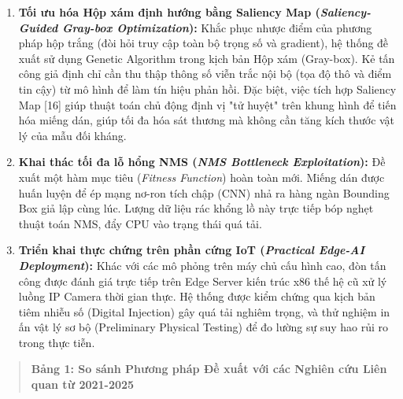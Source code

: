 \documentclass[a4paper,fleqn]{cas-dc}
\begin{document}
\begin{enumerate}
\def\labelenumi{\arabic{enumi}.}
\item
  \textbf{Tối ưu hóa Hộp xám định hướng bằng Saliency Map
  (\emph{Saliency-Guided Gray-box Optimization}):} Khắc phục nhược điểm
  của phương pháp hộp trắng (đòi hỏi truy cập toàn bộ trọng số và
  gradient), hệ thống đề xuất sử dụng Genetic Algorithm trong kịch bản
  Hộp xám (Gray-box). Kẻ tấn công giả định chỉ cần thu thập thông số
  viễn trắc nội bộ (tọa độ thô và điểm tin cậy) từ mô hình để làm tín
  hiệu phản hồi. Đặc biệt, việc tích hợp Saliency Map {[}16{]} giúp
  thuật toán chủ động định vị "tử huyệt" trên khung hình để tiến hóa
  miếng dán, giúp tối đa hóa sát thương mà không cần tăng kích thước vật
  lý của mẫu đối kháng.
\item
  \textbf{Khai thác tối đa lỗ hổng NMS (\emph{NMS Bottleneck
  Exploitation}):} Đề xuất một hàm mục tiêu (\emph{Fitness Function})
  hoàn toàn mới. Miếng dán được huấn luyện để ép mạng nơ-ron tích chập
  (CNN) nhả ra hàng ngàn Bounding Box giả lập cùng lúc. Lượng dữ liệu
  rác khổng lồ này trực tiếp bóp nghẹt thuật toán NMS, đẩy CPU vào trạng
  thái quá tải.
\item
  \textbf{Triển khai thực chứng trên phần cứng IoT (\emph{Practical
  Edge-AI Deployment}):} Khác với các mô phỏng trên máy chủ cấu hình
  cao, đòn tấn công được đánh giá trực tiếp trên Edge Server kiến trúc
  x86 thế hệ cũ xử lý luồng IP Camera thời gian thực. Hệ thống được kiểm
  chứng qua kịch bản tiêm nhiễu số (Digital Injection) gây quá tải
  nghiêm trọng, và thử nghiệm in ấn vật lý sơ bộ (Preliminary Physical
  Testing) để đo lường sự suy hao rủi ro trong thực tiễn.
\end{enumerate}

\begin{quote}
\textbf{Bảng 1: So sánh Phương pháp Đề xuất với các Nghiên cứu Liên quan
từ 2021-2025}
\end{quote}
\end{document}
